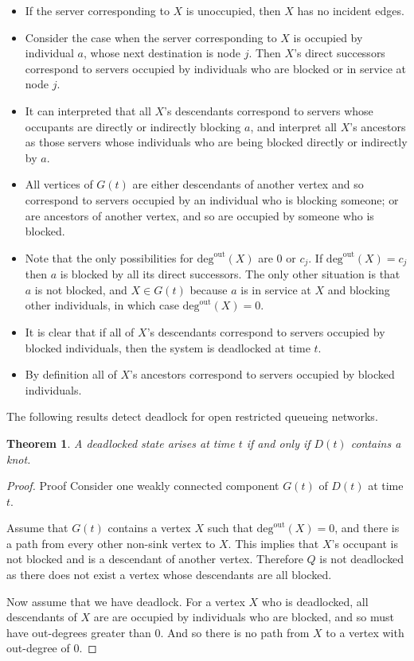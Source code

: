 \documentclass{article}
\newtheorem{theorem}{Theorem}
\numberwithin{equation}{section}
\begin{document}
\begin{itemize}

  \item If the server corresponding to $X$ is unoccupied, then $X$ has no incident edges.
  \item Consider the case when the server corresponding to $X$ is occupied by individual $a$, whose next destination is node $j$. Then $X$'s direct successors correspond to servers occupied by individuals who are blocked or in service at node $j$.
  \item It can interpreted that all $X$'s descendants correspond to servers whose occupants are directly or indirectly blocking $a$, and interpret all $X$'s ancestors as those servers whose individuals who are being blocked directly or indirectly by $a$.
  \item All vertices of $G(t)$ are either descendants of another vertex and so correspond to servers occupied by an individual who is blocking someone; or are ancestors of another vertex, and so are occupied by someone who is blocked.
  \item Note that the only possibilities for $\text{deg}^{\text{out}}(X)$ are 0 or $c_j$. If $\text{deg}^{\text{out}}(X) = c_j$ then $a$ is blocked by all its direct successors. The only other situation is that $a$ is not blocked, and $X \in G(t)$ because $a$ is in service at $X$ and blocking other individuals, in which case $\text{deg}^{\text{out}}(X) = 0$.
  \item It is clear that if all of $X$'s descendants correspond to servers occupied by blocked individuals, then the system is deadlocked at time $t$.
  \item By definition all of $X$'s ancestors correspond to servers occupied by blocked individuals.

\end{itemize}

The following results detect deadlock for open restricted queueing networks.

\begin{theorem}\label{thrm:knot}
A deadlocked state arises at time $t$ if and only if $D(t)$ contains a knot.
\end{theorem}

\begin{proof}{Proof}
Consider one weakly connected component $G(t)$ of $D(t)$ at time $t$.

Assume that $G(t)$ contains a vertex $X$ such that $\text{deg}^{\text{out}}(X) = 0$, and there is a path from every other non-sink vertex to $X$.
This implies that $X$'s occupant is not blocked and is a descendant of another vertex.
Therefore $Q$ is not deadlocked as there does not exist a vertex whose descendants are all blocked.

Now assume that we have deadlock.
For a vertex $X$ who is deadlocked, all descendants of $X$ are are occupied by individuals who are blocked, and so must have out-degrees greater than 0.
And so there is no path from $X$ to a vertex with out-degree of 0.

\end{proof}
\end{document}
